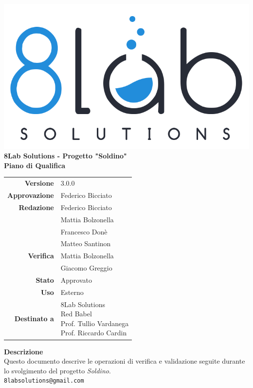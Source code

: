\thispagestyle{empty}
\begin{titlepage}
	\begin{center}
		\includegraphics[scale = 0.3]{res/images/logo8_crop.png}\\
		\large \textbf{8Lab Solutions - Progetto "Soldino"} \\
		\vfill
		\Huge \textbf{Piano di Qualifica}
		\vspace*{\fill} 
        \vfill
        \large
        \begin{tabular}{r|l}
                        \textbf{Versione} & 3.0.0\\
                        \textbf{Approvazione} & Federico Bicciato\\
                        \textbf{Redazione} &
                        	Federico Bicciato\\&
                        	Mattia Bolzonella\\&
                        	Francesco Donè\\&
                        	Matteo Santinon\\
                        \textbf{Verifica} &
                        	Mattia Bolzonella \\&
                        	Giacomo Greggio \\
                        \textbf{Stato} & Approvato\\
                        \textbf{Uso} & Esterno\\
                        \textbf{Destinato a} & \parbox[t]{5cm}{8Lab Solutions\\Red Babel\\Prof. Tullio Vardanega\\Prof. Riccardo Cardin}
                \end{tabular}
                \vfill
                \normalsize
                \textbf{Descrizione}\\
                Questo documento descrive le operazioni di verifica e validazione seguite durante lo svolgimento del progetto \textit{Soldino}.\\
                \vfill
                \small
                \texttt{8labsolutions@gmail.com}
	\end{center}
\end{titlepage}